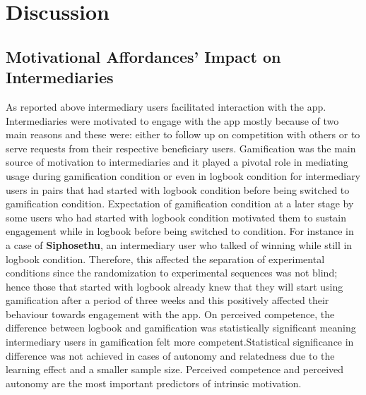 \section{Discussion}
\subsection{Motivational Affordances' Impact on Intermediaries}
As reported above intermediary users facilitated interaction with the app. Intermediaries were motivated to engage with the app mostly because of two main reasons and these were: either to follow up on competition with others or to serve requests from their respective beneficiary users. Gamification was the main source of motivation to intermediaries and it played a pivotal role in mediating usage during gamification condition or even in logbook condition for intermediary users in pairs that had started with logbook condition before being switched to gamification condition. Expectation of gamification condition at a later stage by some users who had started with logbook condition motivated them to sustain engagement while in logbook before being switched to condition. For instance in a case of \textbf{Siphosethu}, an intermediary user who talked of winning while still in logbook condition. Therefore, this affected the separation of experimental conditions since the randomization to experimental sequences was not blind; hence those that started with logbook already knew that they will start using gamification after a period of three weeks and this positively affected their behaviour towards engagement with the app. On perceived competence, the difference between logbook and gamification was statistically significant meaning intermediary users in gamification felt more competent.Statistical significance in difference was not achieved in cases of autonomy and relatedness due to the learning effect and a smaller sample size.  Perceived competence and perceived autonomy are the most important predictors of intrinsic motivation. 


